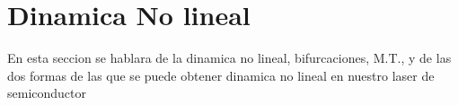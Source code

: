 
\section{Dinamica No lineal}

	En esta seccion se hablara de la dinamica no lineal, bifurcaciones, M.T., y de las dos formas de las que se puede obtener dinamica no lineal en nuestro laser de semiconductor

	\cite{rosado2018experimental}
